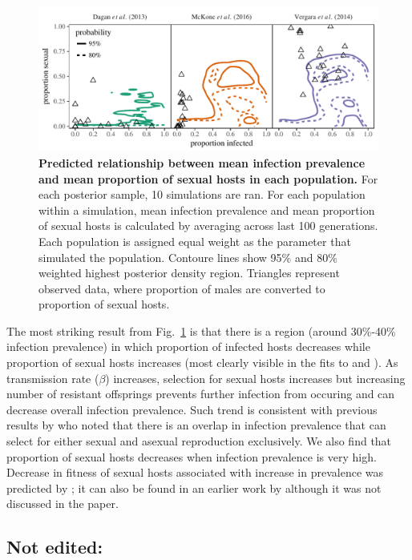 \documentclass{article}\usepackage[]{graphicx}\usepackage[]{color}
\newcommand{\fref}[1]{Fig.~\ref{fig:#1}}
\begin{document}
\begin{figure}[!ht]
\includegraphics[width=\textwidth]{../fig/simulated_data.pdf}
\caption{{\bf Predicted relationship between mean infection prevalence and mean proportion of sexual hosts in each population.}
For each posterior sample, 10 simulations are ran.
For each population within a simulation, mean infection prevalence and mean proportion of sexual hosts is calculated by averaging across last 100 generations. 
Each population is assigned equal weight as the parameter that simulated the population.
Contoure lines show 95\% and 80\% weighted highest posterior density region.
Triangles represent observed data, where proportion of males are converted to proportion of sexual hosts.
}
\label{fig:ivs}
\end{figure}

The most striking result from \fref{ivs} is that there is a region (around 30\%-40\% infection prevalence) in which proportion of infected hosts decreases while proportion of sexual hosts increases (most clearly visible in the fits to \cite{mckone2016fine} and \cite{vergara2014infection}).
As transmission rate ($\beta$) increases, selection for sexual hosts increases but increasing number of resistant offsprings prevents further infection from occuring and can decrease overall infection prevalence.
Such trend is consistent with previous results by \cite{lively2001trematode} who noted that there is an overlap in infection prevalence that can select for either sexual and asexual reproduction exclusively.
We also find that proportion of sexual hosts decreases when infection prevalence is very high.
Decrease in fitness of sexual hosts associated with increase in prevalence was predicted by \cite{ashby2015diversity}; 
it can also be found in an earlier work by \cite{lively2010epidemiological} although it was not discussed in the paper.

\subsection*{Not edited:}
\end{document}
